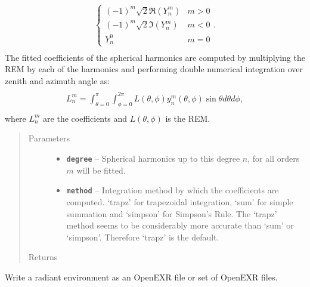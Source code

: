 \documentclass[a4paper,10pt,english]{sphinxmanual}
\begin{document}
\begin{fulllineitems}
\begin{fulllineitems}
\begin{align*}
\begin{aligned}
\begin{split}
\begin{cases}
(-1)^{m}\sqrt{2}\Re(Y_{n}^{m}) & m>0\\
(-1)^{m}\sqrt{2}\Im(Y_{n}^{m}) & m<0\\
Y_{n}^{0} & m=0
\end{cases}.\end{split}\end{aligned}\end{align*}
The fitted coefficients of the spherical harmonics are computed by multiplying the REM by each of the
harmonics and performing double numerical integration over zenith and azimuth angle as:
\begin{align*}\begin{aligned}
\begin{split}L_{n}^{m}=\int_{\theta=0}^{\pi}\int_{\phi=0}^{2\pi}L(\theta,\phi)y_{n}^{m}(\theta,\phi)\sin\theta d\theta d\phi,\end{split}\end{aligned}\end{align*}
where \(L_{n}^{m}\) are the coefficients and \(L(\theta,\phi)\) is the REM.
\begin{quote}\begin{description}
\item[{Parameters}] \leavevmode\begin{itemize}
\item {} 
\textbf{\texttt{degree}} -- Spherical harmonics up to this degree \(n\), for all orders \(m\) will be fitted.

\item {} 
\textbf{\texttt{method}} -- Integration method by which the coefficients are computed. `trapz' for trapezoidal integration,
`sum' for simple summation and `simpson' for Simpson's Rule. The `trapz' method seems to be
considerably more accurate than `sum' or `simpson'. Therefore `trapz' is the default.

\end{itemize}

\item[{Returns}] \leavevmode


\end{description}\end{quote}

\end{fulllineitems}


\begin{fulllineitems}
\label{packages:librad.RadEnv.write_openexr}
Write a radiant environment as an OpenEXR file or set of OpenEXR files.


\end{fulllineitems}
\end{fulllineitems}
\end{document}
